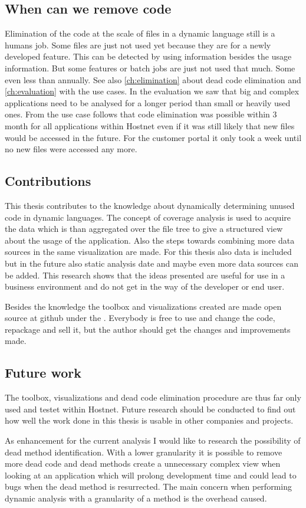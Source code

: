 \subsection*{When can we remove code}
Elimination of the code at the scale of files in a dynamic language still is a humans job. Some files are just not used yet because they are for a newly developed feature. This can be detected by using \vcs information besides the usage information. But some features or batch jobs are just not used that much. Some even less than annually. See also \autoref{ch:elimination} about dead code elimination and \autoref{ch:evaluation} with the use cases. In the evaluation we saw that big and complex applications need to be analysed for a longer period than small or heavily used ones. From the use case follows that code elimination was possible within 3 month for all applications within Hostnet even if it was still likely that new files would be accessed in the future. For the customer portal it only took a week until no new files were accessed any more.

\subsection*{Contributions}
This thesis contributes to the knowledge about dynamically determining unused code in dynamic languages. The concept of coverage analysis is used to acquire the data which is than aggregated over the file tree to give a structured view about the usage of the application. Also the steps towards combining more data sources in the same visualization are made. For this thesis also \vcs data is included but in the future also static analysis date and maybe even more data sources can be added. This research shows that the ideas presented are useful for use in a business environment and do not get in the way of the developer or end user.

Besides the knowledge the toolbox and visualizations created are made open source at github under the . Everybody is free to use and change the code, repackage and sell it, but the author should get the changes and improvements made.

\subsection*{Future work}

%

The toolbox, visualizations and dead code elimination procedure are thus far only used and testet within Hostnet. Future research should be conducted to find out how well the work done in this thesis is usable in other companies and projects.

As enhancement for the current analysis I would like to research the possibility of dead method identification. With a lower granularity it is possible to remove more dead code and dead methods create a unnecessary complex view when looking at an application which will prolong development time and could lead to bugs when the dead method is resurrected. The main concern when performing dynamic analysis with a granularity of a method is the overhead caused.